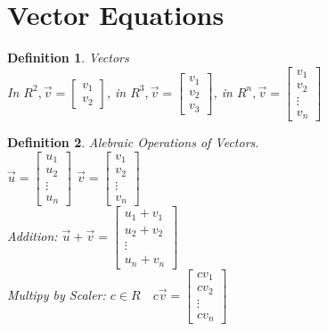 \documentclass[a4paper,12pt,openany]{book}
\theoremstyle{defn}
\newtheorem{defn}{Definition}[section]
\theoremstyle{expl}
\begin{document}
\section{Vector Equations}
\begin{defn}
\textup{Vectors\\
In $R^2, \vec{v} = \left[\begin{array}{c} v_1 \\ v_2 \end{array}\right]$, in $R^3, \vec{v}=\left[\begin{array}{c} v_1 \\ v_2 \\v_3\end{array}\right]$, in $R^n, \vec{v} =\left[\begin{array}{c} v_1 \\ v_2 \\ \vdots \\ v_n\end{array}\right]$}\end{defn}
\begin{defn}
\textup{
Alebraic Operations of Vectors.\\
$\vec{u}=\left[\begin{array}{c} u_1\\u_2\\\vdots\\u_n \end{array}\right]$
$\vec{v}=\left[\begin{array}{c} v_1\\v_2\\\vdots\\v_n \end{array}\right]$\\
Addition: $\vec{u}+\vec{v}= \left[\begin{array}{c} u_1+v_1\\u_2+v_2\\\vdots\\u_n+v_n \end{array}\right]$\\
Multipy by Scaler: $c\in R\quad c\vec{v}=\left[\begin{array}{c} cv_1\\cv_2\\\vdots\\cv_n \end{array}\right]$
}\end{defn}
\end{document}
